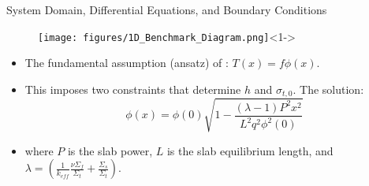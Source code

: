 \documentclass[9pt,t]{beamer}
\newcommand{\QWITH}{\qquad \text{WITH} \qquad}
\begin{document}


\begin{frame}{System Domain, Differential Equations, and Boundary Conditions}
    \vspace*{-0.45cm}
    \begin{figure}[T]
        \centering
        \texttt{[image: figures/1D\_Benchmark\_Diagram.png]}<1->
    \end{figure}
    \begin{itemize}
        \item <2-> The fundamental assumption (ansatz) of \cite{analytical-benchmark}: $T(x)=f\phi(x)$.
        \item <3-> This imposes two constraints that determine $h$ and $\sigma_{t,0}$. The solution:
        \begin{equation}
            \phi(x) = \phi(0) \sqrt{1 - \frac{(\lambda - 1)P^{2}x^{2}}{L^{2}q^{2}\phi^2(0)}}
        \end{equation}
        \item <3-> where $P$ is the slab power, $L$ is the slab equilibrium length, and $\lambda = (\frac{1}{k_{eff}}\frac{\nu \Sigma_{f}}{\Sigma_{t}} + \frac{\Sigma_{s}}{\Sigma_{t}} )$.
    \end{itemize}
\end{frame}
\end{document}
